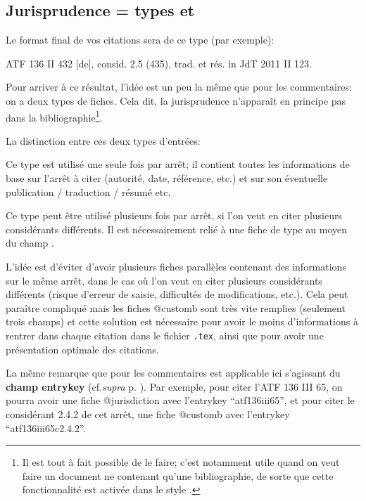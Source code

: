 \documentclass[a4paper]{ltxdockit}[2011/03/25]
\newcommand{\bbltxslb}{\sty{biblatex{\-}-swiss-{\-}legal-\-bibliography}\xspace}
\renewcommand{\tex}{\texttt{.tex}\xspace}
\newcommand{\supra}{\emph{supra}\xspace}
\newcommand{\cf}{cf.\xspace}
\newcommand{\GM}{\enquote}
\newcommand{\pex}{\textnormal{par exemple}\xspace}
\newcommand{\Pex}{\textnormal{Par exemple}\xspace}
\begin{document}
\subsection{Jurisprudence = types  et }

Le format final de vos citations sera de ce type (\pex):

\begin{center}
ATF 136 II 432 [de], consid. 2.5 (435), trad. et rés. in JdT 2011 II 123.
\end{center}

Pour arriver à ce résultat, l'idée est un peu la même que pour les commentaires: on a deux types de fiches. Cela dit, la jurisprudence n'apparaît en principe pas dans la bibliographie\footnote{Il est tout à fait possible de le faire; c'est notamment utile quand on veut faire un document ne contenant qu'une bibliographie, de sorte que cette fonctionnalité est activée dans le style \bbltxslb.}.

La distinction entre ces deux types d'entrées:
\begin{marglist}
\item[\bibtype{jurisdiction}] Ce type est utilisé une seule fois par arrêt; il contient toutes les informations de base sur l'arrêt à citer (autorité, date, référence, etc.) et sur son éventuelle publication / traduction / résumé etc.
\item[\bibtype{customb}] Ce type peut être utilisé plusieurs fois par arrêt, si l'on veut en citer plusieurs considérants différents. Il est nécessairement relié à une fiche de type  au moyen du champ .
\end{marglist}

L'idée est d'éviter d'avoir plusieurs fiches parallèles contenant des informations sur le même arrêt, dans le cas où l'on veut en citer plusieurs considérants différents (risque d'erreur de saisie, difficultés de modifications, etc.). Cela peut paraître compliqué mais les fiches @customb sont très vite remplies (seulement trois champs) et cette solution est nécessaire pour avoir le moins d'informations à rentrer dans chaque citation dans le fichier \tex, ainsi que pour avoir une présentation optimale des citations.

La même remarque que pour les commentaires est applicable ici s'agissant du \textbf{champ entrykey} (\cf \supra p. \pageref{entrykeysyst}). \Pex, pour citer l'ATF 136 III 65, on pourra avoir une fiche @jurisdiction avec l'entrykey \GM{atf136iii65}, et pour citer le considérant 2.4.2 de cet arrêt, une fiche @customb avec l'entrykey \GM{atf136iii65c2.4.2}.
\end{document}
